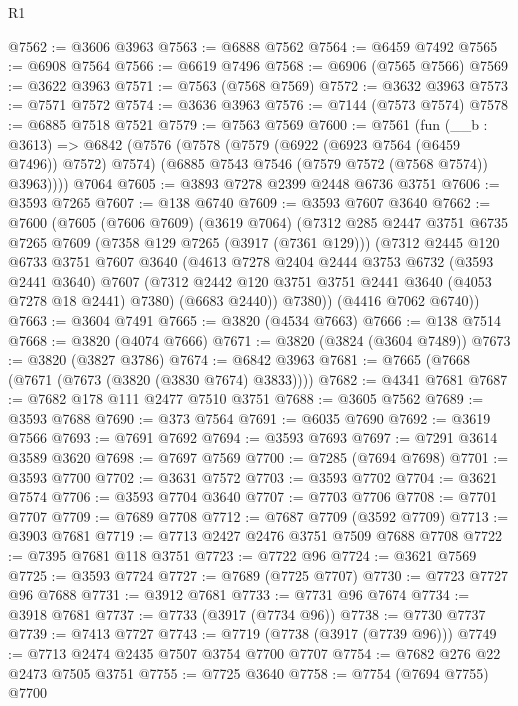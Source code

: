 \begin{lexlean}{R1}
\begin{coremodule}
@7562 := @3606 @3963
@7563 := @6888 @7562
@7564 := @6459 @7492
@7565 := @6908 @7564
@7566 := @6619 @7496
@7568 := @6906 (@7565 @7566)
@7569 := @3622 @3963
@7571 := @7563 (@7568 @7569)
@7572 := @3632 @3963
@7573 := @7571 @7572
@7574 := @3636 @3963
@7576 := @7144 (@7573 @7574)
@7578 := @6885 @7518 @7521
@7579 := @7563 @7569
@7600 := @7561
    (fun (__b : @3613) =>
    @6842
      (@7576
        (@7578
          (@7579 (@6922 (@6923 @7564 (@6459 @7496)) @7572) @7574)
          (@6885 @7543 @7546 (@7579 @7572 (@7568 @7574)) @3963))))
    @7064
@7605 := @3893 @7278 @2399 @2448 @6736 @3751
@7606 := @3593 @7265
@7607 := @138 @6740
@7609 := @3593 @7607 @3640
@7662 := @7600
    (@7605
      (@7606 @7609)
      (@3619 @7064)
      (@7312
        @285
        @2447
        @3751
        @6735
        @7265
        @7609
        (@7358 @129 @7265 (@3917 (@7361 @129)))
        (@7312
          @2445
          @120
          @6733
          @3751
          @7607
          @3640
          (@4613
            @7278
            @2404
            @2444
            @3753
            @6732
            (@3593 @2441 @3640)
            @7607
            (@7312 @2442 @120 @3751 @3751 @2441 @3640 (@4053 @7278 @18 @2441) @7380)
            (@6683 @2440))
          @7380))
      (@4416 @7062 @6740))
@7663 := @3604 @7491
@7665 := @3820 (@4534 @7663)
@7666 := @138 @7514
@7668 := @3820 (@4074 @7666)
@7671 := @3820 (@3824 (@3604 @7489))
@7673 := @3820 (@3827 @3786)
@7674 := @6842 @3963
@7681 := @7665 (@7668 (@7671 (@7673 (@3820 (@3830 @7674) @3833))))
@7682 := @4341 @7681
@7687 := @7682 @178 @111 @2477 @7510 @3751
@7688 := @3605 @7562
@7689 := @3593 @7688
@7690 := @373 @7564
@7691 := @6035 @7690
@7692 := @3619 @7566
@7693 := @7691 @7692
@7694 := @3593 @7693
@7697 := @7291 @3614 @3589 @3620
@7698 := @7697 @7569
@7700 := @7285 (@7694 @7698)
@7701 := @3593 @7700
@7702 := @3631 @7572
@7703 := @3593 @7702
@7704 := @3621 @7574
@7706 := @3593 @7704 @3640
@7707 := @7703 @7706
@7708 := @7701 @7707
@7709 := @7689 @7708
@7712 := @7687 @7709 (@3592 @7709)
@7713 := @3903 @7681
@7719 := @7713 @2427 @2476 @3751 @7509 @7688 @7708
@7722 := @7395 @7681 @118 @3751
@7723 := @7722 @96
@7724 := @3621 @7569
@7725 := @3593 @7724
@7727 := @7689 (@7725 @7707)
@7730 := @7723 @7727 @96 @7688
@7731 := @3912 @7681
@7733 := @7731 @96 @7674
@7734 := @3918 @7681
@7737 := @7733 (@3917 (@7734 @96))
@7738 := @7730 @7737
@7739 := @7413 @7727
@7743 := @7719 (@7738 (@3917 (@7739 @96)))
@7749 := @7713 @2474 @2435 @7507 @3754 @7700 @7707
@7754 := @7682 @276 @22 @2473 @7505 @3751
@7755 := @7725 @3640
@7758 := @7754 (@7694 @7755) @7700

\end{coremodule}
\end{lexlean}
